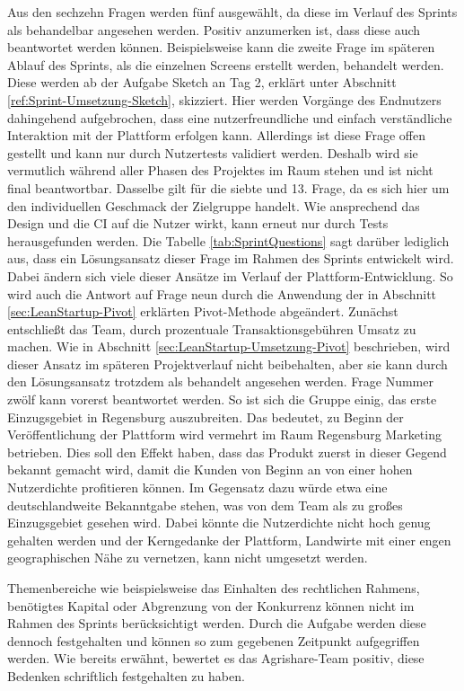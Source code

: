 Aus den sechzehn Fragen werden fünf ausgewählt, da diese im Verlauf des Sprints als behandelbar angesehen werden. Positiv anzumerken ist, dass diese auch beantwortet werden können. Beispielsweise kann die zweite Frage im späteren Ablauf des Sprints, als die einzelnen Screens erstellt werden, behandelt werden. Diese werden ab der Aufgabe Sketch an Tag 2, erklärt unter Abschnitt \ref{ref:Sprint-Umsetzung-Sketch}, skizziert. Hier werden Vorgänge des Endnutzers dahingehend aufgebrochen, dass eine nutzerfreundliche und einfach verständliche Interaktion mit der Plattform erfolgen kann. Allerdings ist diese Frage offen gestellt und kann nur durch Nutzertests validiert werden. Deshalb wird sie vermutlich während aller Phasen des Projektes im Raum stehen und ist nicht final beantwortbar. Dasselbe gilt für die siebte und 13. Frage, da es sich hier um den individuellen Geschmack der Zielgruppe handelt. Wie ansprechend das Design und die \ac{CI} auf die Nutzer wirkt, kann erneut nur durch Tests herausgefunden werden. Die Tabelle \ref{tab:SprintQuestions} sagt darüber lediglich aus, dass ein Lösungsansatz dieser Frage im Rahmen des Sprints entwickelt wird. Dabei ändern sich viele dieser Ansätze im Verlauf der Plattform-Entwicklung. So wird auch die Antwort auf Frage neun durch die Anwendung der in Abschnitt \ref{sec:LeanStartup-Pivot} erklärten Pivot-Methode abgeändert. Zunächst entschließt das Team, durch prozentuale Transaktionsgebühren Umsatz zu machen. Wie in Abschnitt \ref{sec:LeanStartup-Umsetzung-Pivot} beschrieben, wird dieser Ansatz im späteren Projektverlauf nicht beibehalten, aber sie kann durch den Lösungsansatz trotzdem als behandelt angesehen werden. Frage Nummer zwölf kann vorerst beantwortet werden. So ist sich die Gruppe einig, das erste Einzugsgebiet in Regensburg auszubreiten. Das bedeutet, zu Beginn der Veröffentlichung der Plattform wird vermehrt im Raum Regensburg Marketing betrieben. Dies soll den Effekt haben, dass das Produkt zuerst in dieser Gegend bekannt gemacht wird, damit die Kunden von Beginn an von einer hohen Nutzerdichte profitieren können. Im Gegensatz dazu würde etwa eine deutschlandweite Bekanntgabe stehen, was von dem Team als zu großes Einzugsgebiet gesehen wird. Dabei könnte die Nutzerdichte nicht hoch genug gehalten werden und der Kerngedanke der Plattform, Landwirte mit einer engen geographischen Nähe zu vernetzen, kann nicht umgesetzt werden. 

Themenbereiche wie beispielsweise das Einhalten des rechtlichen Rahmens, benötigtes Kapital oder Abgrenzung von der Konkurrenz können nicht im Rahmen des Sprints berücksichtigt werden. Durch die Aufgabe werden diese dennoch festgehalten und können so zum gegebenen Zeitpunkt aufgegriffen werden. Wie bereits erwähnt, bewertet es das Agrishare-Team positiv, diese Bedenken schriftlich festgehalten zu haben.

